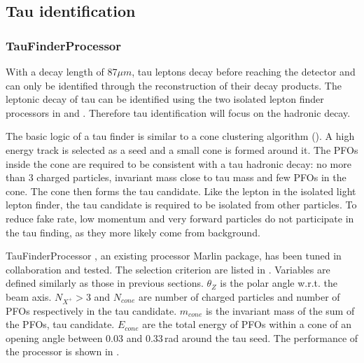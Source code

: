 \subsection{Tau identification}

\subsubsection{TauFinderProcessor}

With a decay length of 87$\mu{m}$, tau leptons decay before reaching the detector and can only be identified through the reconstruction of their decay products. The leptonic decay of tau can be identified using the two isolated lepton finder processors in  and  . Therefore tau identification will focus on the hadronic decay.

The basic logic of a tau finder is similar to a cone clustering algorithm (). A high energy track is selected as a seed and a small cone is formed around it. The PFOs inside the cone are required to be consistent with a tau hadronic decay: no more than 3 charged particles, invariant mass close to tau mass and few PFOs in the cone. The cone then forms the tau candidate. Like the lepton in the isolated light lepton finder, the tau candidate is required to be isolated from other particles. To reduce fake rate, low momentum and very forward particles do not participate in the tau finding, as they more likely come from \ggHad background.

TauFinderProcessor \cite{LCD-Note-2010-009}, an existing processor Marlin package, has been tuned in collaboration and tested. The selection criterion are listed in . Variables are defined similarly as those in previous sections. $\theta_Z$ is the polar angle w.r.t. the beam axis. $N_{X^+} > 3$ and $N_{cone}$ are number of charged particles and number of PFOs respectively in the tau candidate. $m_{cone}$ is the invariant mass of the sum of the PFOs, tau candidate. $E_{cone}$ are the total energy of PFOs within a cone of an opening angle between 0.03 and 0.33\,rad  around the tau seed. The performance of the processor is shown in .

